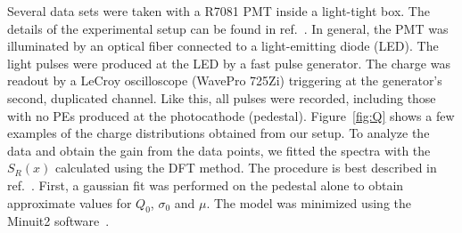 \documentclass[a4paper,11pt]{article}
\begin{document}
Several data sets were taken with a R7081 PMT inside a light-tight box. 
The details of the experimental setup can be found in ref.~\cite{me}.
In general, the PMT was illuminated by an optical fiber connected to a light-emitting diode (LED).
The light pulses were produced at the LED by a fast pulse generator. 
The charge was readout by a LeCroy oscilloscope (WavePro 725Zi) triggering at the generator's second, duplicated channel. 
Like this, all pulses were recorded, including those with no PEs produced at the photocathode (pedestal). 
Figure~\ref{fig:Q} shows a few examples of the charge distributions obtained from our setup.  
To analyze the data and obtain the gain from the data points, we fitted the spectra with the $S_R(x)$ calculated using the DFT method.  
The procedure is best described in ref.~\cite{me}. 
First, a gaussian fit was performed on the pedestal alone to obtain approximate values for $Q_0$, $\sigma_0$ and $\mu$. 
The model was minimized using the Minuit2 software~\cite{Minuit2}. 
\end{document}
